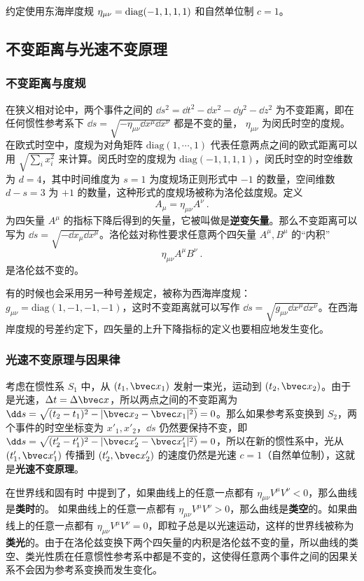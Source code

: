 

约定使用东海岸度规 $\eta_{\mu\nu}=\rm{diag}(-1,1,1,1)$ 和自然单位制 $c=1$。
\subsection{不变距离与光速不变原理}
\subsubsection{不变距离与度规}
在狭义相对论中，两个事件之间的 $\dd s^2=\dd t^2-\dd x^2-\dd y^2-\dd z^2$ 为不变距离，即在任何惯性参考系下 $\dd s=\sqrt{-\eta_{\mu\nu}\dd x^\mu \dd x^\nu}$ 都是不变的量， $\eta_{\mu\nu}$ 为闵氏时空的度规。 在欧式时空中，度规为对角矩阵 $\mathrm{diag}(1,\cdots,1)$ 代表任意两点之间的欧式距离可以用 $\sqrt{\sum_i x_i^2}$ 来计算。闵氏时空的度规为 $\mathrm{diag}(-1,1,1,1)$，闵氏时空的时空维数为 $d=4$，其中时间维度为 $s=1$ 为度规场正则形式中 $-1$ 的数量，空间维数 $d-s=3$ 为 $+1$ 的数量，这种形式的度规场被称为洛伦兹度规。定义
\begin{equation}
A_\mu = \eta_{\mu\nu}A^\nu~.
\end{equation}
为四矢量 $A^\mu$ 的指标下降后得到的矢量，它被叫做是\textbf{逆变矢量}。那么不变距离可以写为 $\dd s=\sqrt{-\dd x_\mu \dd x^\mu}$。洛伦兹对称性要求任意两个四矢量 $A^\mu, B^\mu$ 的“内积”
\begin{equation}
\eta_{\mu\nu} A^\mu B^\nu~.
\end{equation}
是洛伦兹不变的。

有的时候也会采用另一种号差规定，被称为西海岸度规： $g_{\mu\nu}=\mathrm{diag}(1,-1,-1,-1)$，这时不变距离就可以写作 $\dd s = \sqrt{g_{\mu\nu}\dd x^\mu \dd x^\nu}$。在西海岸度规的号差约定下，四矢量的上升下降指标的定义也要相应地发生变化。
\subsubsection{光速不变原理与因果律}

考虑在惯性系 $S_1$ 中，从 $(t_1,\bvec x_1)$ 发射一束光，运动到 $(t_2,\bvec x_2)$。由于是光速，$\Delta t=\Delta \bvec x$，所以两点之间的不变距离为 $\dd s=\sqrt{(t_2-t_1)^2-|\bvec x_2-\bvec x_1|^2)}=0$。那么如果参考系变换到 $S_2$，两个事件的时空坐标变为 $x'_1,x'_2$，$\dd s$ 仍然要保持不变，即 $\dd s=\sqrt{(t'_2-t'_1)^2-|\bvec x'_2-\bvec x'_1|^2)}=0$，所以在新的惯性系中，光从 $(t'_1,\bvec x'_1)$ 传播到 $(t'_2,\bvec x'_2)$ 的速度仍然是光速 $c=1$（自然单位制），这就是\textbf{光速不变原理}。

在世界线和固有时 中提到了，如果曲线上的任意一点都有 $\eta_{\mu\nu}V^\mu V^\nu<0$，那么曲线是\textbf{类时}的。
如果曲线上的任意一点都有 $\eta_{\mu\nu}V^\mu V^\nu>0$，那么曲线是\textbf{类空}的。如果曲线上的任意一点都有 $\eta_{\mu\nu}V^\mu V^\nu=0$，即粒子总是以光速运动，这样的世界线被称为\textbf{类光}的。由于在洛伦兹变换下两个四矢量的内积是洛伦兹不变的量，所以曲线的类空、类光性质在任意惯性参考系中都是不变的，这使得任意两个事件之间的因果关系不会因为参考系变换而发生变化。